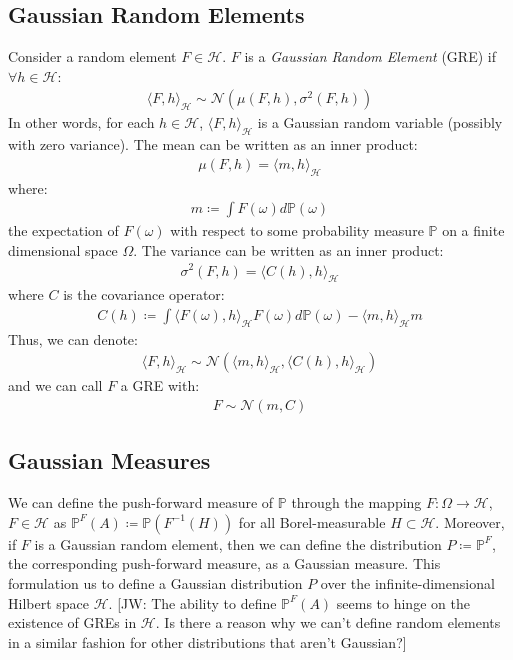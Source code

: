 \documentclass[twoside,11pt]{article}
\newcommand{\jw}[1]{{\color{gray} [JW: #1]}}
\begin{document}
\subsection{Gaussian Random Elements}
 Consider a random element $F \in \mathcal{H}$. $F$ is a \textit{Gaussian Random Element} (GRE) if $\forall h \in \mathcal{H}$:
\begin{align}
    \langle F, h \rangle_\mathcal{H} \sim \mathcal{N}(\mu(F, h), \sigma^2(F, h))
\end{align}
In other words, for each $h \in \mathcal{H}$, $\langle F, h \rangle_\mathcal{H}$ is a Gaussian random variable (possibly with zero variance). The mean can be written as an inner product:
\begin{align}
\mu(F, h) = \langle m, h\rangle_{\mathcal{H}}
\end{align}
where:
\begin{align}
    m \coloneqq \int F(\omega) d \mathbb{P}(\omega)
\end{align}
the expectation of $F(\omega)$ with respect to some probability measure $\mathbb{P}$ on a finite dimensional space $\Omega$. The variance can be written as an inner product:
\begin{align}
\sigma^2(F, h) = \langle C(h), h\rangle_{\mathcal{H}}
\end{align}
where $C$ is the covariance operator:
\begin{align}
    C(h) \coloneqq \int \langle F(\omega), h\rangle_{\mathcal{H}} F(\omega)d \mathbb{P}(\omega) - \langle m, h\rangle_{\mathcal{H}} m 
\end{align}
Thus, we can denote:
\begin{align}
    \langle F, h\rangle_{\mathcal{H}} \sim \mathcal{N}\left(  \langle m, h\rangle_{\mathcal{H}},  \langle C(h), h\rangle_{\mathcal{H}}\right)
\end{align}
and we can call $F$ a GRE with:
\begin{align}
    F \sim \mathcal{N}(m, C)
\end{align}
\subsection{Gaussian Measures \cite{wild2022generalized}}
We can define the push-forward measure of $\mathbb{P}$ through the mapping $F: \Omega \rightarrow \mathcal{H}$, $F \in \mathcal{H}$ as $\mathbb{P}^{F}(A) \coloneqq \mathbb{P}(F^{-1}(H))$ for all Borel-measurable $H \subset \mathcal{H}$. Moreover, if $F$ is a Gaussian random element, then we can define the distribution $P \coloneqq \mathbb{P}^{F}$, the corresponding push-forward measure, as a Gaussian measure. This formulation us to define a Gaussian distribution $P$ over the infinite-dimensional Hilbert space $\mathcal{H}$. \jw{The ability to define $\mathbb{P}^{F}(A)$ seems to hinge on the existence of GREs in $\mathcal{H}$. Is there a reason why we can't define random elements in a similar fashion for other distributions that aren't Gaussian?}
\end{document}
